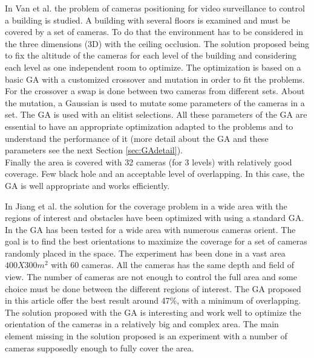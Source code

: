 In Van et al. \cite{83*van2009} the problem of cameras positioning for video surveillance to control a building is studied. A building with several floors is examined and must be covered by a set of cameras. To do that the environment has to be considered in the three dimensions (3D) with the ceiling occlusion. The solution proposed being to fix the altitude of the cameras for each level of the building and considering each level as one independent room to  optimize. 
The optimization is based on a basic GA with a customized crossover and mutation in order to fit the problems. 
For the crossover a swap is done between two cameras from different sets.%
 About the mutation, a Gaussian is used to mutate some parameters of the cameras in a set. The GA is used with an elitist selections. All these parameters of the GA are essential to have an appropriate optimization adapted  to the problems and to understand the performance of it (more detail about the GA and these parameters see the next Section \ref{sec:GAdetail}).  \\ 
Finally the area is covered with 32 cameras (for 3 levels) with relatively good coverage. Few black hole and an acceptable level of overlapping. In this case, the GA is well appropriate and works efficiently.

In Jiang et al. \cite{165*jiang2010} the solution for the coverage problem in a wide area with the regions of interest and obstacles have been optimized with using a standard GA. In \cite{165*jiang2010} the GA has been tested for a wide area with numerous cameras orient. The goal is to find the best orientations to maximize the coverage for a set of cameras  randomly placed in the space. The experiment has been done in a vast area $400X300m^2$ with 60 cameras.
 All the cameras has the same depth and field of view. The number of cameras are not enough to control the full area and some choice must be done between the different regions of interest. The GA proposed in this article offer the best result around 47\%, with a minimum of overlapping. \\
The solution proposed with the GA is interesting and work well to optimize the orientation of the cameras in  a relatively big and complex area. The main element missing in the solution proposed is an experiment with a number of cameras supposedly enough to fully cover the area. 

